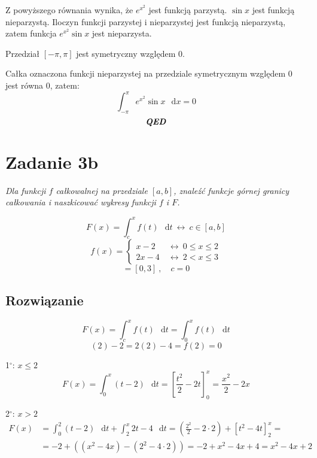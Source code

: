 \documentclass[12pt]{article}
\newcommand{\case}[1]{\textrm{#1$^\circ$}}
\newcommand{\for}{\ \leftrightarrow\ }
\newcommand{\Integral}[4]{\int_{#1}^{#2} \! #3 \, \mathop{}\!\mathrm{d}#4}
\newcommand{\qed}{\textbf{\textit{QED}}}
\DeclareMathOperator{\?}{?}
\begin{document}
Z powyższego równania wynika, że $e^{x^2}$ jest funkcją parzystą. $\sin{x}$
jest funkcją nieparzystą. Iloczyn funkcji parzystej i nieparzystej jest funkcją nieparzystą,
zatem funkcja $e^{x^2} \sin{x}$ jest nieparzysta.

Przedział $[-\pi, \pi]$ jest symetryczny względem $0$.

Całka oznaczona funkcji nieparzystej na przedziale symetrycznym względem $0$
jest równa $0$, zatem:
\begin{equation*}
    \Integral{-\pi}{\pi}{e^{x^2} \sin{x}}{x} = 0
\end{equation*}
\[\qed\]

\clearpage

\section{Zadanie 3b}
\textit{Dla funkcji $f$ całkowalnej na przedziale $[a,b]$, znaleźć funkcje górnej
granicy całkowania i naszkicować wykresy funkcji $f$ i $F$.}

\begin{equation*}
    F(x) = \Integral{c}{x}{f(t)}{t} \for c \in [a,b]
\end{equation*}
\begin{equation*}
    f(x) =
    \left\{ \begin{aligned}
        x - 2  & \for 0 \le x \le 2 \\
        2x - 4 & \for 2  <  x \le 3
    \end{aligned} \right.
\end{equation*}
\begin{equation*}
    [a,b] = [0,3]\ , \quad c = 0
\end{equation*}

\subsection*{Rozwiązanie}

\begin{equation*}
    F(x) = \Integral{c}{x}{f(t)}{t} = \Integral{0}{x}{f(t)}{t}
\end{equation*}
\[ (2) - 2 = 2(2) - 4 = f(2) = 0 \]

\case{1}: $x \le 2$
\begin{equation*}
    F(x) = \Integral{0}{x}{(t-2)}{t} = \left[ \frac{t^2}{2} - 2t \right]_0^x = \frac{x^2}{2} - 2x
\end{equation*}

\case{2}: $x > 2$
\begin{align*}
    F(x) &= \Integral{0}{2}{(t-2)}{t} + \Integral{2}{x}{2t-4}{t} =
    \left( \frac{2^2}{2} - 2\cdot 2 \right) + \left[ t^2 - 4t \right]_2^x =\\
    &= -2 + \left( ( x^2 - 4x ) - (2^2 - 4\cdot 2) \right) =
    -2 + x^2 - 4x + 4 = x^2 - 4x + 2
\end{align*}
\end{document}
